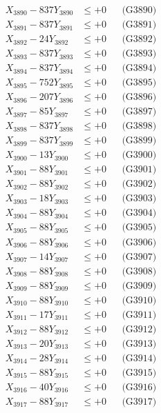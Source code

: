 \documentclass[a4paper,10pt]{article}
\begin{document}
{\begin{align}
X_{3890} - 837Y_{3890} &\leq +0 && \text{(G3890)} \\
\allowbreak
X_{3891} - 837Y_{3891} &\leq +0 && \text{(G3891)} \\
X_{3892} - 24Y_{3892} &\leq +0 && \text{(G3892)} \\
X_{3893} - 837Y_{3893} &\leq +0 && \text{(G3893)} \\
X_{3894} - 837Y_{3894} &\leq +0 && \text{(G3894)} \\
X_{3895} - 752Y_{3895} &\leq +0 && \text{(G3895)} \\
X_{3896} - 207Y_{3896} &\leq +0 && \text{(G3896)} \\
X_{3897} - 85Y_{3897} &\leq +0 && \text{(G3897)} \\
X_{3898} - 837Y_{3898} &\leq +0 && \text{(G3898)} \\
X_{3899} - 837Y_{3899} &\leq +0 && \text{(G3899)} \\
X_{3900} - 13Y_{3900} &\leq +0 && \text{(G3900)} \\
\allowbreak
X_{3901} - 88Y_{3901} &\leq +0 && \text{(G3901)} \\
X_{3902} - 88Y_{3902} &\leq +0 && \text{(G3902)} \\
X_{3903} - 18Y_{3903} &\leq +0 && \text{(G3903)} \\
X_{3904} - 88Y_{3904} &\leq +0 && \text{(G3904)} \\
X_{3905} - 88Y_{3905} &\leq +0 && \text{(G3905)} \\
X_{3906} - 88Y_{3906} &\leq +0 && \text{(G3906)} \\
X_{3907} - 14Y_{3907} &\leq +0 && \text{(G3907)} \\
X_{3908} - 88Y_{3908} &\leq +0 && \text{(G3908)} \\
X_{3909} - 88Y_{3909} &\leq +0 && \text{(G3909)} \\
X_{3910} - 88Y_{3910} &\leq +0 && \text{(G3910)} \\
\allowbreak
X_{3911} - 17Y_{3911} &\leq +0 && \text{(G3911)} \\
X_{3912} - 88Y_{3912} &\leq +0 && \text{(G3912)} \\
X_{3913} - 20Y_{3913} &\leq +0 && \text{(G3913)} \\
X_{3914} - 28Y_{3914} &\leq +0 && \text{(G3914)} \\
X_{3915} - 88Y_{3915} &\leq +0 && \text{(G3915)} \\
X_{3916} - 40Y_{3916} &\leq +0 && \text{(G3916)} \\
X_{3917} - 88Y_{3917} &\leq +0 && \text{(G3917)} \\

\end{align}}
\end{document}
